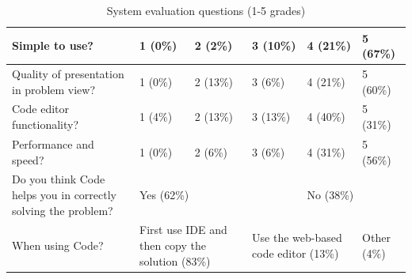 \documentclass{llncs}
\begin{document}
\begin{table}[htb]
\caption{System evaluation questions (1-5 grades)}
\begin{center}
\begin{tabular}{ |p{5cm}|l|l|l|l|l| }
\hline
Simple to use? & 1 (0\%) & 2 (2\%) & 3 (10\%) & 4 (21\%) & 5 (67\%) \\
\hline
Quality of presentation in problem view? & 1 (0\%) & 2 (13\%) & 3 (6\%) & 4
(21\%) & 5 (60\%)
\\
\hline
Code editor functionality? & 1 (4\%) & 2 (13\%) & 3 (13\%) & 4 (40\%) & 5 (31\%)
\\
\hline
Performance and speed? & 1 (0\%) & 2 (6\%) & 3 (6\%) & 4 (31\%) & 5 (56\%) \\
\hline
Do you think Code helps you in correctly solving the problem? &
\multicolumn{3}{l|}{Yes (62\%)} & \multicolumn{2}{l|}{No (38\%)}
 \\
\hline
When using Code? & \multicolumn{2}{p{2.5cm}|}{First use IDE and then copy the
solution (83\%)} & \multicolumn{2}{p{2.5cm}|}{Use the web-based code editor
(13\%)} & Other (4\%) \\
\hline
\end{tabular}
\label{table:system_evaluation}
\end{center}
\end{table}
\end{document}
